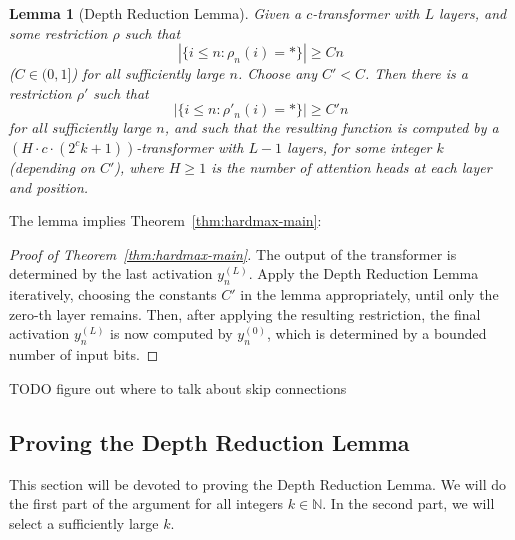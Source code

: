 \documentclass[11pt,a4paper]{article}
\newcounter{theorem}
\newtheorem{lemma}[theorem]{Lemma}
\begin{document}
\begin{lemma}[Depth Reduction Lemma]\label{lemma:depth-red}
Given a $c$-transformer with $L$ layers, and some restriction $\rho$ such that
\begin{equation}
|\{i \leq n: \rho_n(i) = *\}| \geq Cn
\end{equation}
($C \in (0,1]$)
for all sufficiently large $n$.
Choose any $C' < C$.
Then there is a restriction $\rho'$ 
such that
\begin{equation}
|\{i \leq n: \rho'_n(i) = *\}| \geq C'n
\end{equation}
for all sufficiently large $n$, 
and such that the resulting function is computed by a $(H\cdot c\cdot(2^ck+1))$-transformer with $L-1$ layers, for some integer $k$ (depending on $C'$), where $H \geq 1$ is the number of attention heads at each layer and position.
\end{lemma}
The lemma implies Theorem~\ref{thm:hardmax-main}:
\begin{proof}[Proof of Theorem~\ref{thm:hardmax-main}]
The output of the transformer is determined by the last activation $y_{n}^{(L)}$.
Apply the Depth Reduction Lemma iteratively, choosing the constants $C'$ in the lemma appropriately, until only the zero-th layer remains.
Then, after applying the resulting restriction, the final activation $y_{n}^{(L)}$ is now computed by $y_{n}^{(0)}$, which is determined by a bounded number of input bits.
\end{proof}





TODO figure out where to talk about skip connections

\subsection{Proving the Depth Reduction Lemma}
This section will be devoted to proving the Depth Reduction Lemma.
We will do the first part of the argument for all integers $k \in \mathbb{N}$.
In the second part, we will select a sufficiently large $k$. %
\end{document}
